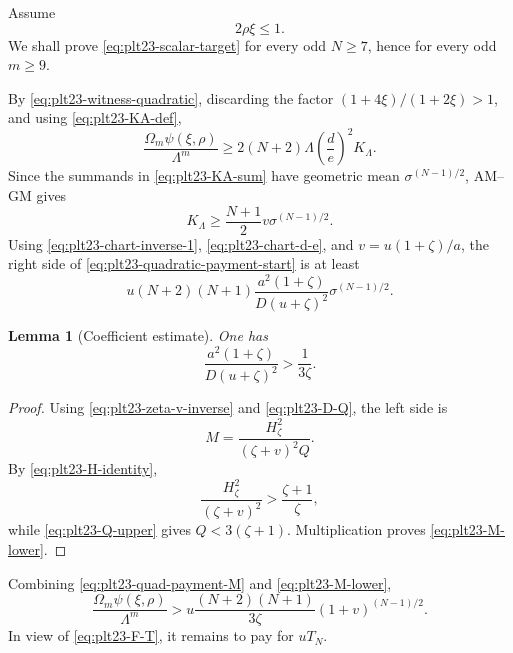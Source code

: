 \documentclass[11pt]{article}
\newtheorem{lemma}[theorem]{Lemma}
\numberwithin{equation}{section}
\begin{document}
Assume
\begin{equation}\label{eq:plt23-quadratic-branch}
  2\rho\xi\le1.
\end{equation}
We shall prove \eqref{eq:plt23-scalar-target} for every odd $N\ge7$, hence for
every odd $m\ge9$.

By \eqref{eq:plt23-witness-quadratic}, discarding the factor
$(1+4\xi)/(1+2\xi)>1$, and using \eqref{eq:plt23-KA-def},
\begin{equation}\label{eq:plt23-quadratic-payment-start}
  \frac{\Omega_m\psi(\xi,\rho)}{\Lambda^m}
  \ge2(N+2)\Lambda\left(\frac {d}{e}\right)^2K_\Lambda.
\end{equation}
Since the summands in \eqref{eq:plt23-KA-sum} have geometric mean
$\sigma^{(N-1)/2}$, AM--GM gives
\begin{equation}\label{eq:plt23-KA-AMGM}
  K_\Lambda\ge\frac{N+1}{2}
  v\sigma^{(N-1)/2}.
\end{equation}
Using \eqref{eq:plt23-chart-inverse-1}, \eqref{eq:plt23-chart-d-e}, and
$v=u(1+\zeta)/a$, the right side of
\eqref{eq:plt23-quadratic-payment-start} is at least
\begin{equation}\label{eq:plt23-quad-payment-M}
  u(N+2)(N+1)
  \frac{a^2(1+\zeta)}{D(u+\zeta)^2}
  \sigma^{(N-1)/2}.
\end{equation}

\begin{lemma}[Coefficient estimate]\label{lem:plt23-quad-coeff}
  One has
  \begin{equation}\label{eq:plt23-M-lower}
    \frac{a^2(1+\zeta)}{D(u+\zeta)^2}
    >\frac{1}{3\zeta}.
  \end{equation}
\end{lemma}

\begin{proof}
  Using \eqref{eq:plt23-zeta-v-inverse} and \eqref{eq:plt23-D-Q}, the left side is
  \[
    M=\frac{H_\zeta^2}{(\zeta+v)^2Q}.
  \]
  By \eqref{eq:plt23-H-identity},
  \[
    \frac{H_\zeta^2}{(\zeta+v)^2}
    >\frac{\zeta+1}{\zeta},
  \]
  while \eqref{eq:plt23-Q-upper} gives $Q<3(\zeta+1)$.  Multiplication proves
  \eqref{eq:plt23-M-lower}.
\end{proof}

Combining \eqref{eq:plt23-quad-payment-M} and \eqref{eq:plt23-M-lower},
\begin{equation}\label{eq:plt23-quad-payment-final}
  \frac{\Omega_m\psi(\xi,\rho)}{\Lambda^m}
  >u\frac{(N+2)(N+1)}{3\zeta}
  (1+v)^{(N-1)/2}.
\end{equation}
In view of \eqref{eq:plt23-F-T}, it remains to pay for $uT_N$.
\end{document}
